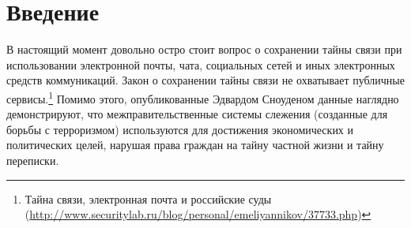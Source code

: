 \newpage
\addtocounter{chapter}{1}
\tableofcontents
\newpage
\section{Введение}
В настоящий момент довольно остро стоит вопрос о сохранении тайны связи при использовании электронной почты, чата, социальных сетей и иных электронных средств коммуникаций. Закон о сохранении тайны связи не охватывает публичные сервисы.\footnote{ Тайна связи, электронная почта и российские суды (\url{http://www.securitylab.ru/blog/personal/emeliyannikov/37733.php})}
Помимо этого, опубликованные Эдвардом Сноуденом данные наглядно демонстрируют, что межправительственные системы слежения (созданные для борьбы с терроризмом) используются для достижения экономических и политических целей,  нарушая права граждан на тайну частной жизни и тайну переписки.\\

